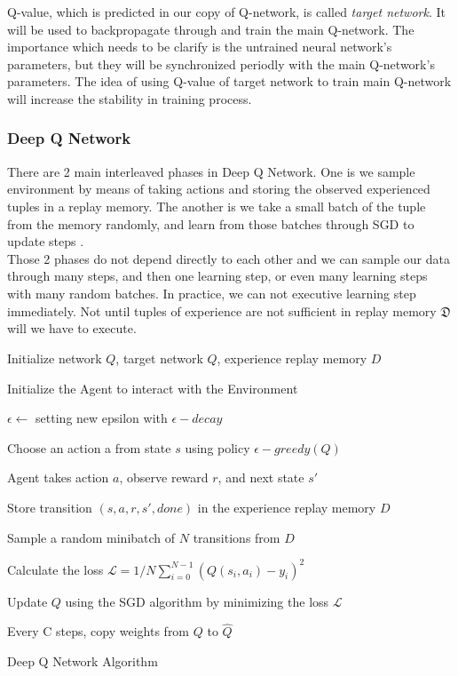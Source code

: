 \documentclass{article}
\begin{document}
Q-value, which is predicted in our copy of Q-network, is called \textit{target network}. It will be used to backpropagate through and train the main Q-network. The importance which needs to be clarify is the untrained neural network's parameters, but they will be synchronized periodly with the main Q-network's parameters. The idea of using Q-value of target network to train main Q-network will increase the stability in training process.
\subsubsection*{Deep Q Network}
There are 2 main interleaved phases in Deep Q Network. One is we sample environment by means of taking actions and storing the observed experienced tuples in a replay memory. The another is we take a small batch of the tuple from the memory randomly, and learn from those batches through SGD to update steps \cite{SGD}. \\

Those 2 phases do not depend directly to each other and we can sample our data through many steps, and then one learning step, or even many learning steps with many random batches. In practice, we can not executive learning step immediately. Not until tuples of experience are not sufficient in replay memory $\mathfrak{D}$ will we have to execute.

\begin{algorithm} 
    Initialize network $Q$, target network $\hat{Q}$, experience replay memory $D$
    
    Initialize the Agent to interact with the Environment
    
    {
        $\epsilon \leftarrow$ setting new epsilon with $\epsilon-decay$
        
        Choose an action a from state $s$ using policy $\epsilon-greedy\left(Q\right)$
        
        Agent takes action $a$, observe reward $r$, and next state $s'$
        
        Store transition $\left(s, a, r, s', done \right)$ in the experience replay memory $D$
        
        {
            Sample a random minibatch of $N$ transitions from $D$
            
            {
            }
            
            Calculate the loss $\mathcal{L} = 1/N \sum^{N-1}_{i=0}\left(Q\left(s_i, a_i\right) - y_i\right)^2$
            
            Update $Q$ using the SGD algorithm by minimizing the loss $\mathcal{L}$
            
            Every C steps, copy weights from $Q$ to $\hat{Q}$
        }
    }
    \caption{Deep Q Network Algorithm}
\end{algorithm}
\end{document}
